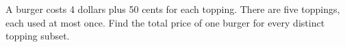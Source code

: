 A burger costs 4 dollars plus 50 cents for each topping. There are five toppings, each used at most once. Find the total price of one burger for every distinct topping subset.
